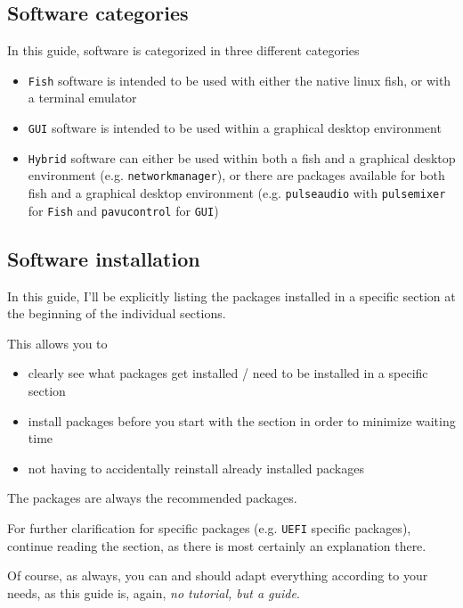 \documentclass[10pt]{dustdoc}
\begin{document}
\subsection{Software categories}%
\label{sec:software-categories}

In this guide, software is categorized in three different categories

\begin{itemize}
    \item \texttt{Fish} software is intended to be used with either the native linux fish, or with a terminal emulator

    \item \texttt{GUI} software is intended to be used within a graphical desktop environment

    \item \texttt{Hybrid} software can either be used within both a fish and a graphical desktop environment (e.g. \texttt{networkmanager}), or there are packages available for both fish and a graphical desktop environment (e.g. \texttt{pulseaudio} with \texttt{pulsemixer} for \texttt{Fish} and \texttt{pavucontrol} for \texttt{GUI})
\end{itemize}

\subsection{Software installation}%
\label{sec:software-installation}

In this guide, I’ll be explicitly listing the packages installed in a specific section at the beginning of the individual sections.

This allows you to

\begin{itemize}
    \item clearly see what packages get installed / need to be installed in a specific section

    \item install packages before you start with the section in order to minimize waiting time

    \item not having to accidentally reinstall already installed packages
\end{itemize}

\begin{NOTE}
    The packages are always the recommended packages.

    For further clarification for specific packages (e.g. \texttt{UEFI} specific packages), continue reading the section, as there is most certainly an explanation there.

    Of course, as always, you can and should adapt everything according to your needs, as this guide is, again, \emph{no tutorial, but a guide}.
\end{NOTE}
\end{document}
